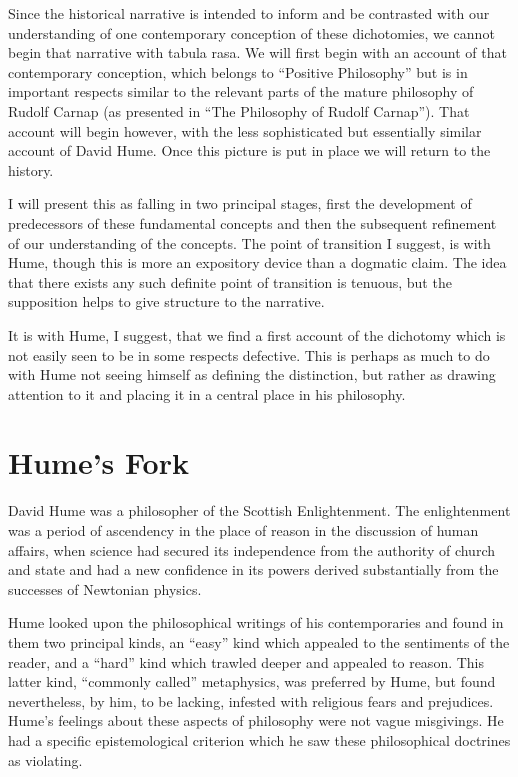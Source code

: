 Since the historical narrative is intended to inform and be contrasted
with our understanding of one contemporary conception of these
dichotomies, we cannot begin that narrative with tabula rasa.
We will first begin with an account of that contemporary conception,
which belongs to ``Positive Philosophy'' but is in important respects
similar to the relevant parts of the mature philosophy of Rudolf
Carnap (as presented in ``The Philosophy of Rudolf
Carnap''\cite{carnap83a}).
That account will begin however, with the less sophisticated but
essentially similar account of David Hume.
Once this picture is put in place we will return to the history.

I will present this as falling in two principal stages, first the
development of predecessors of these fundamental concepts and then the
subsequent refinement of our understanding of the concepts.
The point of transition I suggest, is with Hume, though this is more
an expository device than a dogmatic claim.
The idea that there exists any such definite point of transition is
tenuous, but the supposition helps to give structure to the narrative.

It is with Hume, I suggest, that we find a first account of the
dichotomy which is not easily seen to be in some respects defective. 
This is perhaps as much to do with Hume not seeing himself as defining
the distinction, but rather as drawing attention to it and placing it
in a central place in his philosophy. 

\section{Hume's Fork}\label{HumesFork}

David Hume was a philosopher of the Scottish Enlightenment.
The enlightenment was a period of ascendency in the place of reason in
the discussion of human affairs, when science had secured its
independence from the authority of church and state and had a new
confidence in its powers derived substantially from the successes of
Newtonian physics.

Hume looked upon the philosophical writings of his contemporaries and
found in them two principal kinds, an ``easy'' kind which appealed to
the sentiments of the reader, and a ``hard'' kind which trawled deeper
and appealed to reason.
This latter kind, ``commonly called'' metaphysics, was preferred by
Hume, but found nevertheless, by him, to be lacking, infested with religious 
fears and prejudices.
Hume's feelings about these aspects of philosophy were not vague
misgivings.
He had a specific epistemological criterion which he saw these
philosophical doctrines as violating.

